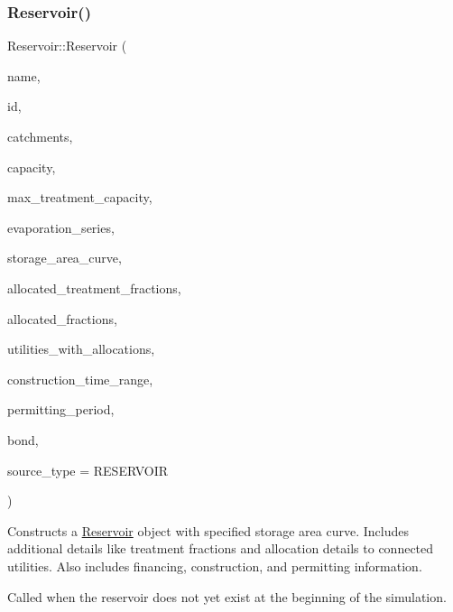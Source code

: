 \subsubsection{\texorpdfstring{Reservoir()}{Reservoir()}\hspace{0.1cm}{\footnotesize\ttfamily [7/9]}}
{\footnotesize\ttfamily Reservoir\+::\+Reservoir (\begin{DoxyParamCaption}\item[{const char $\ast$}]{name,  }\item[{const int}]{id,  }\item[{const vector$<$ \mbox{\hyperlink{classCatchment}{Catchment}} $\ast$$>$ \&}]{catchments,  }\item[{const double}]{capacity,  }\item[{const double}]{max\+\_\+treatment\+\_\+capacity,  }\item[{Evaporation\+Series \&}]{evaporation\+\_\+series,  }\item[{Data\+Series $\ast$}]{storage\+\_\+area\+\_\+curve,  }\item[{vector$<$ double $>$ $\ast$}]{allocated\+\_\+treatment\+\_\+fractions,  }\item[{vector$<$ double $>$ $\ast$}]{allocated\+\_\+fractions,  }\item[{vector$<$ int $>$ $\ast$}]{utilities\+\_\+with\+\_\+allocations,  }\item[{const vector$<$ double $>$ \&}]{construction\+\_\+time\+\_\+range,  }\item[{double}]{permitting\+\_\+period,  }\item[{\mbox{\hyperlink{classBond}{Bond}} \&}]{bond,  }\item[{int}]{source\+\_\+type = {\ttfamily RESERVOIR} }\end{DoxyParamCaption})}



Constructs a \mbox{\hyperlink{classReservoir}{Reservoir}} object with specified storage area curve. Includes additional details like treatment fractions and allocation details to connected utilities. Also includes financing, construction, and permitting information. 

Called when the reservoir does not yet exist at the beginning of the simulation.


